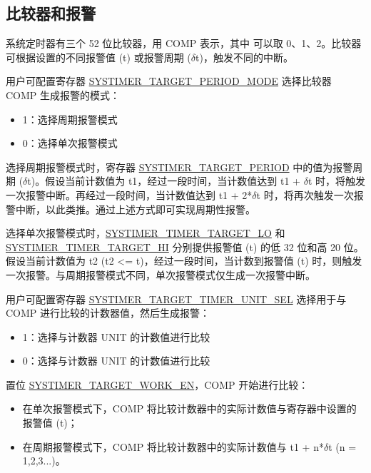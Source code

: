 \documentclass[main\_\_CN.tex]{subfiles}
\begin{document}
\subsection{比较器和报警}
系统定时器有三个 52 位比较器，用 COMP 表示，其中  可以取 0、1、2。比较器可根据设置的不同报警值 (t) 或报警周期 ($\delta$t)，触发不同的中断。

用户可配置寄存器 \hyperref[fielddesc:SYSTIMERTARGET0PERIODMODE]{SYSTIMER\_TARGET\_PERIOD\_MODE} 选择比较器 COMP 生成报警的模式：
\begin{itemize}
    \item 1：选择周期报警模式
    \item 0：选择单次报警模式
\end{itemize}

选择周期报警模式时，寄存器 \hyperref[fielddesc:SYSTIMERTARGET2PERIOD]{SYSTIMER\_TARGET\_PERIOD} 中的值为报警周期 ($\delta$t)。假设当前计数值为 t1，经过一段时间，当计数值达到 t1 + $\delta$t 时，将触发一次报警中断。再经过一段时间，当计数值达到 t1 + 2*$\delta$t 时，将再次触发一次报警中断，以此类推。通过上述方式即可实现周期性报警。

选择单次报警模式时，\hyperref[fielddesc:SYSTIMERTIMERTARGET0LO]{SYSTIMER\_TIMER\_TARGET\_LO} 和 \hyperref[fielddesc:SYSTIMERTIMERTARGET0HI]{SYSTIMER\_TIMER\_TARGET\_HI} 分别提供报警值 (t) 的低 32 位和高 20 位。假设当前计数值为 t2 (t2 <= t)，经过一段时间，当计数到报警值 (t) 时，则触发一次报警。与周期报警模式不同，单次报警模式仅生成一次报警中断。

用户可配置寄存器 \hyperref[fielddesc:SYSTIMERTARGET0TIMERUNITSEL]{SYSTIMER\_TARGET\_TIMER\_UNIT\_SEL} 选择用于与 COMP 进行比较的计数器值，然后生成报警：

\begin{itemize}
        \item 1：选择与计数器 UNIT 的计数值进行比较
        \item 0：选择与计数器 UNIT 的计数值进行比较
\end{itemize}

置位 \hyperref[fielddesc:SYSTIMERTARGET0WORKEN]{SYSTIMER\_TARGET\_WORK\_EN}，COMP 开始进行比较：
\begin{itemize}
    \item 在单次报警模式下，COMP 将比较计数器中的实际计数值与寄存器中设置的报警值 (t)；
    \item 在周期报警模式下，COMP 将比较计数器中的实际计数值与 t1 + n*$\delta$t (n = 1,2,3...)。
\end{itemize}
\end{document}
